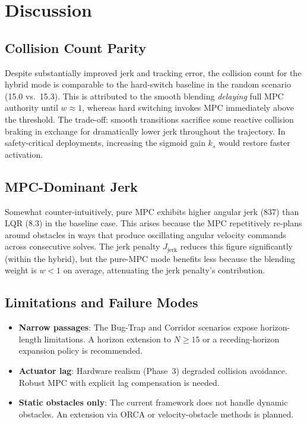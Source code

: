 \documentclass[journal]{IEEEtran}
\begin{document}
\section{Discussion}\label{sec:discussion}

\subsection{Collision Count Parity}

Despite substantially improved jerk and tracking error, the collision count for
the hybrid mode is comparable to the hard-switch baseline in the random
scenario (15.0 vs.\ 15.3).
This is attributed to the smooth blending \emph{delaying} full MPC authority
until $w \approx 1$, whereas hard switching invokes MPC immediately above the
threshold.
The trade-off: smooth transitions sacrifice some reactive collision braking in
exchange for dramatically lower jerk throughout the trajectory.
In safety-critical deployments, increasing the sigmoid gain $k_s$ would
restore faster activation.

\subsection{MPC-Dominant Jerk}

Somewhat counter-intuitively, pure MPC exhibits higher angular jerk (837) than
LQR (8.3) in the baseline case.
This arises because the MPC repetitively re-plans around obstacles in ways
that produce oscillating angular velocity commands across consecutive solves.
The jerk penalty $J_{\mathrm{jerk}}$ reduces this figure significantly
(within the hybrid), but the pure-MPC mode benefits less because the blending
weight is $w < 1$ on average, attenuating the jerk penalty's contribution.

\subsection{Limitations and Failure Modes}

\begin{itemize}
  \item \textbf{Narrow passages}: The Bug-Trap and Corridor scenarios expose
    horizon-length limitations. A horizon extension to $N\geq15$ or a
    receding-horizon expansion policy is recommended.
  \item \textbf{Actuator lag}: Hardware realism (Phase~3) degraded collision
    avoidance. Robust MPC with explicit lag compensation is needed.
  \item \textbf{Static obstacles only}: The current framework does not handle
    dynamic obstacles. An extension via ORCA or velocity-obstacle methods
    is planned.
\end{itemize}
\end{document}
